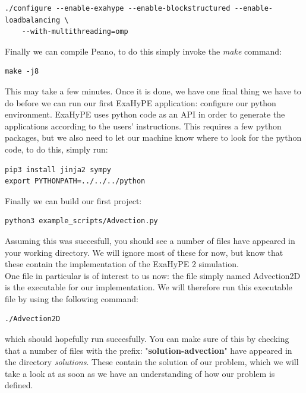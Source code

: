 \documentclass[12pt,letterpaper]{article}
\begin{document}
\begin{lstlisting}[style = Bash]
./configure --enable-exahype --enable-blockstructured --enable-loadbalancing \
    --with-multithreading=omp
\end{lstlisting}

Finally we can compile Peano, to do this simply invoke the \textit{make} command:

\begin{lstlisting}[style = Bash]
make -j8
\end{lstlisting}

This may take a few minutes. Once it is done, we have one final thing we have to do before we can run our first ExaHyPE application: configure our python environment. ExaHyPE uses python code as an API in order to generate the applications according to the users' instructions. This requires a few python packages, but we also need to let our machine know where to look for the python code, to do this, simply run:

\begin{lstlisting}[style = Bash]
pip3 install jinja2 sympy
export PYTHONPATH=../../../python
\end{lstlisting}

Finally we can build our first project:

\begin{lstlisting}[style = Bash]
python3 example_scripts/Advection.py
\end{lstlisting}

Assuming this was succesfull, you should see a number of files have appeared in your working directory. We will ignore most of these for now, but know that these contain the implementation of the ExaHyPE 2 simulation.\\
One file in particular is of interest to us now: the file simply named Advection2D is the executable for our implementation. We will therefore run this executable file by using the following command:

\begin{lstlisting}[style = Bash]
./Advection2D
\end{lstlisting}

which should hopefully run succesfully. You can make sure of this by checking that a number of files with the prefix: "\textbf{solution-advection}" have appeared in the directory \textit{solutions}. These contain the solution of our problem, which we will take a look at as soon as we have an understanding of how our problem is defined.
\end{document}
